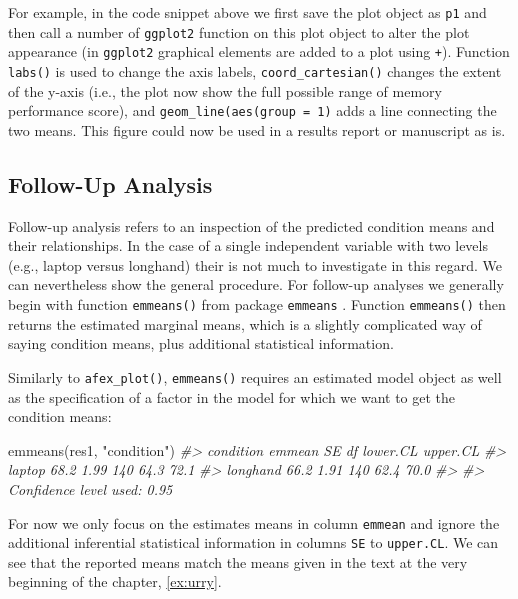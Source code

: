 \documentclass[
]{book}
\newenvironment{Shaded}{\begin{snugshade}}{\end{snugshade}}
\newcommand{\CommentTok}[1]{\textcolor[rgb]{0.56,0.35,0.01}{\textit{#1}}}
\newcommand{\FunctionTok}[1]{\textcolor[rgb]{0.00,0.00,0.00}{#1}}
\newcommand{\NormalTok}[1]{#1}
\newcommand{\StringTok}[1]{\textcolor[rgb]{0.31,0.60,0.02}{#1}}
\begin{document}
For example, in the code snippet above we first save the plot object as \texttt{p1} and then call a number of \texttt{ggplot2} function on this plot object to alter the plot appearance (in \texttt{ggplot2} graphical elements are added to a plot using \texttt{+}). Function \texttt{labs()} is used to change the axis labels, \texttt{coord\_cartesian()} changes the extent of the y-axis (i.e., the plot now show the full possible range of memory performance score), and \texttt{geom\_line(aes(group\ =\ 1)} adds a line connecting the two means. This figure could now be used in a results report or manuscript as is.

\hypertarget{follow-up-analysis}{%
\subsection{Follow-Up Analysis}\label{follow-up-analysis}}

Follow-up analysis refers to an inspection of the predicted condition means and their relationships. In the case of a single independent variable with two levels (e.g., laptop versus longhand) their is not much to investigate in this regard. We can nevertheless show the general procedure. For follow-up analyses we generally begin with function \texttt{emmeans()} from package \texttt{emmeans} \citep{lenth2021}. Function \texttt{emmeans()} then returns the estimated marginal means, which is a slightly complicated way of saying condition means, plus additional statistical information.

Similarly to \texttt{afex\_plot()}, \texttt{emmeans()} requires an estimated model object as well as the specification of a factor in the model for which we want to get the condition means:

\begin{Shaded}
\begin{Highlighting}[]
\FunctionTok{emmeans}\NormalTok{(res1, }\StringTok{"condition"}\NormalTok{)}
\CommentTok{\#\textgreater{}  condition emmean   SE  df lower.CL upper.CL}
\CommentTok{\#\textgreater{}  laptop      68.2 1.99 140     64.3     72.1}
\CommentTok{\#\textgreater{}  longhand    66.2 1.91 140     62.4     70.0}
\CommentTok{\#\textgreater{} }
\CommentTok{\#\textgreater{} Confidence level used: 0.95}
\end{Highlighting}
\end{Shaded}

For now we only focus on the estimates means in column \texttt{emmean} and ignore the additional inferential statistical information in columns \texttt{SE} to \texttt{upper.CL}. We can see that the reported means match the means given in the text at the very beginning of the chapter, \ref{ex:urry}.
\end{document}
